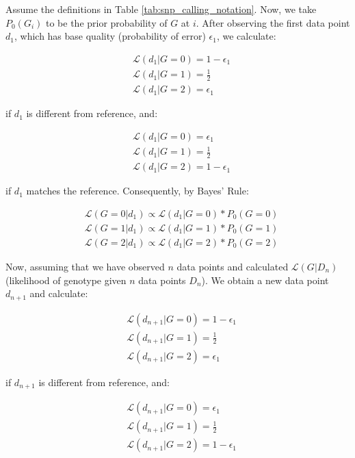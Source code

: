 Assume the definitions in Table \ref{tab:snp_calling_notation}. Now, we take $P_0(G_i)$ to be the prior probability of $G$ at $i$. After observing the first data point $d_1$, which has base quality (probability of error) $\epsilon_1$, we calculate:

\begin{align*}
&\mathcal{L}(d_1|G=0) = 1 - \epsilon_1\\
&\mathcal{L}(d_1|G=1) = \frac{1}{2}\\
&\mathcal{L}(d_1|G=2) = \epsilon_1
\end{align*}

if $d_1$ is different from reference, and:

\begin{align*}
&\mathcal{L}(d_1|G=0) = \epsilon_1\\
&\mathcal{L}(d_1|G=1) = \frac{1}{2}\\
&\mathcal{L}(d_1|G=2) = 1 - \epsilon_1
\end{align*}

if $d_1$ matches the reference. Consequently, by Bayes' Rule:

\begin{align*}
&\mathcal{L}(G=0|d_1) \propto \mathcal{L}(d_1|G=0) * P_0(G=0)\\
&\mathcal{L}(G=1|d_1) \propto \mathcal{L}(d_1|G=1) * P_0(G=1)\\
&\mathcal{L}(G=2|d_1) \propto \mathcal{L}(d_1|G=2) *  P_0(G=2)
\end{align*}

Now, assuming that we have observed $n$ data points and calculated $\mathcal{L}(G|D_n)$ (likelihood of genotype given $n$ data points $D_n$). We obtain a new data point $d_{n+1}$ and calculate:

\begin{align*}
&\mathcal{L}(d_{n+1}|G=0) = 1 - \epsilon_1\\
&\mathcal{L}(d_{n+1}|G=1) = \frac{1}{2}\\
&\mathcal{L}(d_{n+1}|G=2) = \epsilon_1
\end{align*}

if $d_{n+1}$ is different from reference, and:

\begin{align*}
&\mathcal{L}(d_{n+1}|G=0) = \epsilon_1\\
&\mathcal{L}(d_{n+1}|G=1) = \frac{1}{2}\\
&\mathcal{L}(d_{n+1}|G=2) = 1 - \epsilon_1
\end{align*}

